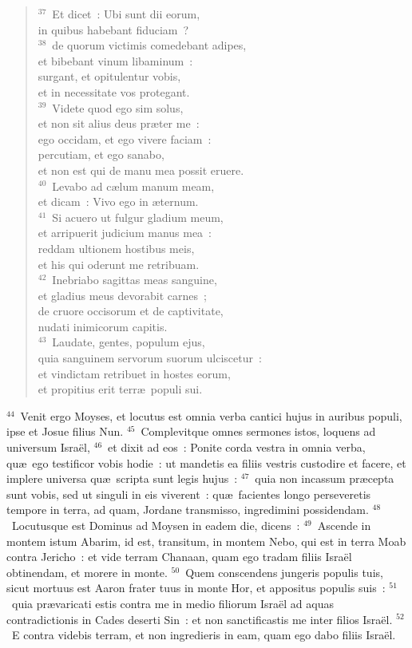 \begin{verse}${}^{37}$~Et dicet~: Ubi sunt dii eorum,\\ in quibus habebant fiduciam~?\\
${}^{38}$~de quorum victimis comedebant adipes,\\ et bibebant vinum libaminum~:\\ surgant, et opitulentur vobis,\\ et in necessitate vos protegant.\\
${}^{39}$~Videte quod ego sim solus,\\ et non sit alius deus pr\ae ter me~:\\ ego occidam, et ego vivere faciam~:\\ percutiam, et ego sanabo,\\ et non est qui de manu mea possit eruere.\\
${}^{40}$~Levabo ad c\ae lum manum meam,\\ et dicam~: Vivo ego in \ae ternum.\\
${}^{41}$~Si acuero ut fulgur gladium meum,\\ et arripuerit judicium manus mea~:\\ reddam ultionem hostibus meis,\\ et his qui oderunt me retribuam.\\
${}^{42}$~Inebriabo sagittas meas sanguine,\\ et gladius meus devorabit carnes~;\\ de cruore occisorum et de captivitate,\\ nudati inimicorum capitis.\\
${}^{43}$~Laudate, gentes, populum ejus,\\ quia sanguinem servorum suorum ulciscetur~:\\ et vindictam retribuet in hostes eorum,\\ et propitius erit terr\ae\ populi sui.\end{verse}


${}^{44}$~Venit ergo Moyses, et locutus est omnia verba cantici hujus in auribus populi, ipse et Josue filius Nun.
${}^{45}$~Complevitque omnes sermones istos, loquens ad universum Isra\"el,
${}^{46}$~et dixit ad eos~: Ponite corda vestra in omnia verba, qu\ae\ ego testificor vobis hodie~: ut mandetis ea filiis vestris custodire et facere, et implere universa qu\ae\ scripta sunt legis hujus~:
${}^{47}$~quia non incassum pr\ae cepta sunt vobis, sed ut singuli in eis viverent~: qu\ae\ facientes longo perseveretis tempore in terra, ad quam, Jordane transmisso, ingredimini possidendam.
${}^{48}$~Locutusque est Dominus ad Moysen in eadem die, dicens~:
${}^{49}$~Ascende in montem istum Abarim, id est, transitum, in montem Nebo, qui est in terra Moab contra Jericho~: et vide terram Chanaan, quam ego tradam filiis Isra\"el obtinendam, et morere in monte.
${}^{50}$~Quem conscendens jungeris populis tuis, sicut mortuus est Aaron frater tuus in monte Hor, et appositus populis suis~:
${}^{51}$~quia pr\ae varicati estis contra me in medio filiorum Isra\"el ad aquas contradictionis in Cades deserti Sin~: et non sanctificastis me inter filios Isra\"el.
${}^{52}$~E contra videbis terram, et non ingredieris in eam, quam ego dabo filiis Isra\"el.

